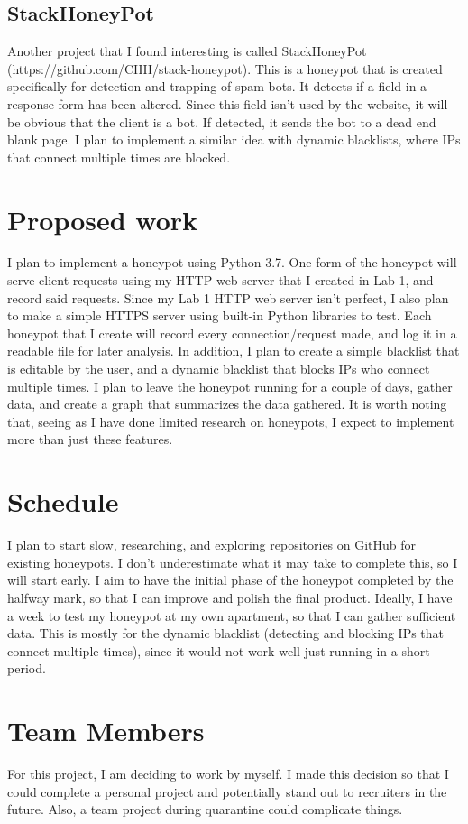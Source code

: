 \documentclass[12pt]{article}
\begin{document}
\subsection{StackHoneyPot}
Another project that I found interesting is called StackHoneyPot (https://github.com/CHH/stack-honeypot).
This is a honeypot that is created specifically for detection and trapping of spam bots.
It detects if a field in a response form has been altered.
Since this field isn't used by the website, it will be obvious that the client is a bot.
If detected, it sends the bot to a dead end blank page.
I plan to implement a similar idea with dynamic blacklists, where IPs that connect multiple times are blocked.

\section{Proposed work}
I plan to implement a honeypot using Python 3.7.
One form of the honeypot will serve client requests using my HTTP web server that I created in Lab 1, and record said requests.
Since my Lab 1 HTTP web server isn't perfect, I also plan to make a simple HTTPS server using built-in Python libraries to test.
Each honeypot that I create will record every connection/request made, and log it in a readable file for later analysis.
In addition, I plan to create a simple blacklist that is editable by the user, and a dynamic blacklist that blocks IPs who connect multiple times.
I plan to leave the honeypot running for a couple of days, gather data, and create a graph that summarizes the data gathered.
It is worth noting that, seeing as I have done limited research on honeypots, I expect to implement more than just these features.

\section{Schedule}
I plan to start slow, researching, and exploring repositories on GitHub for existing honeypots.
I don't underestimate what it may take to complete this, so I will start early.
I aim to have the initial phase of the honeypot completed by the halfway mark, so that I can improve and polish the final product.
Ideally, I have a week to test my honeypot at my own apartment, so that I can gather sufficient data.
This is mostly for the dynamic blacklist (detecting and blocking IPs that connect multiple times), since it would not work well just running in a short period.

\section{Team Members}
For this project, I am deciding to work by myself. I made this decision so that I could complete a personal project and potentially stand out to recruiters in the future. Also, a team project during quarantine could complicate things.
\end{document}
